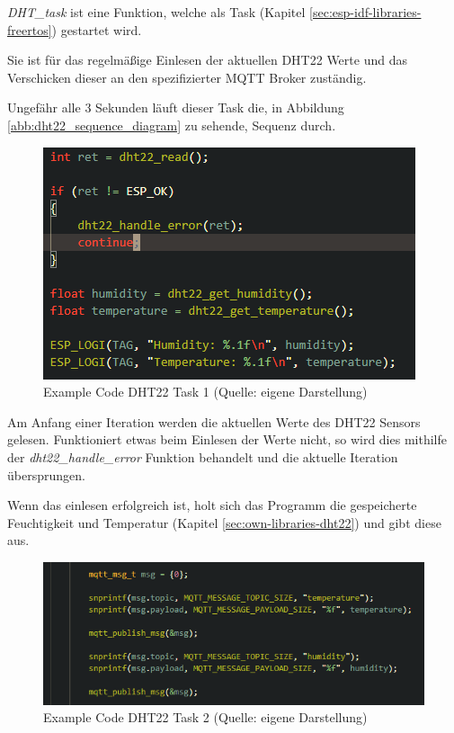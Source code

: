 \textit{DHT\_task} ist eine Funktion, welche als Task (Kapitel \ref{sec:esp-idf-libraries-freertos}) gestartet wird. 

Sie ist für das regelmäßige Einlesen der aktuellen DHT22 Werte und das Verschicken dieser an den spezifizierter MQTT Broker zuständig.

Ungefähr alle 3 Sekunden läuft dieser Task die, in Abbildung \ref{abb:dht22_sequence_diagram} zu sehende, Sequenz durch.

\begin{figure}[H]
    \begin{center}
        \includegraphics[scale=0.8]{images/example_code_dht22_task_one.png}
        \caption{Example Code DHT22 Task 1 (Quelle: eigene Darstellung)}
        \label{abb:example_code_dht22_task_one}
    \end{center}
\end{figure}

Am Anfang einer Iteration werden die aktuellen Werte des DHT22 Sensors gelesen. Funktioniert etwas beim Einlesen der Werte nicht, so wird dies mithilfe der \textit{dht22\_handle\_error} Funktion behandelt und die aktuelle Iteration übersprungen.

Wenn das einlesen erfolgreich ist, holt sich das Programm die gespeicherte Feuchtigkeit und Temperatur (Kapitel \ref{sec:own-libraries-dht22}) und gibt diese aus.

\begin{figure}[H]
    \begin{center}
        \includegraphics[scale=0.8]{images/example_code_dht22_task_two.png}
        \caption{Example Code DHT22 Task 2 (Quelle: eigene Darstellung)}
        \label{abb:example_code_dht22_task_two}
    \end{center}
\end{figure}

